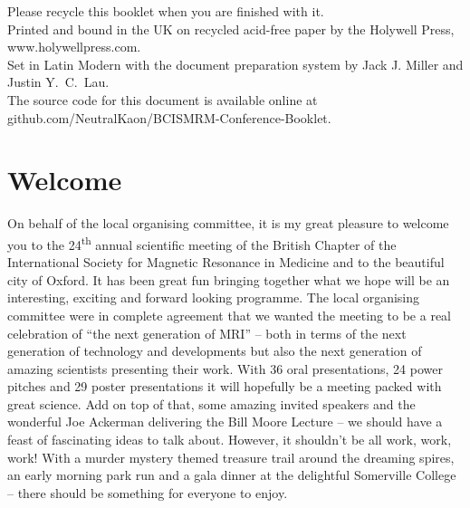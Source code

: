 \documentclass[a5paper,10pt,twoside,onecolumn,openany,helvetica,showtrims]{memoir}
\begin{document}
%
\frontmatter\thispagestyle{empty}\cleartoverso%
\checkandfixthelayout
\thispagestyle{empty} %
    \vspace*{\fill}
    \begin{minipage}{0.45\textwidth}
	\tiny Please recycle this booklet when you are finished with it.\\ Printed and bound in the UK on recycled acid-free paper by the Holywell Press, www.holywellpress.com. \\[2em]
	Set in Latin Modern with the \XeLaTeX{} document preparation system by Jack J. Miller and Justin Y.~C.~Lau.\\[2em]
	The source code for this document is available online at github.com/NeutralKaon/BCISMRM-Conference-Booklet. 
    \end{minipage}\cleartorecto
\tableofcontents*
{}
\mainmatter
\chapter{Welcome}
On behalf of the local organising committee, it is my great pleasure to welcome you to the 24\textsuperscript{th} annual scientific meeting of the British Chapter of the International Society for Magnetic Resonance in Medicine and to the beautiful city of Oxford.  It has been great fun bringing together what we hope will be an interesting, exciting and forward looking programme. The local organising committee were in complete agreement that we wanted the meeting to be a real celebration of ``the next generation of MRI'' – both in terms of the next generation of technology and developments but also the next generation of amazing scientists presenting their work. With 36 oral presentations, 24 power pitches and 29 poster presentations it will hopefully be a meeting packed with great science. Add on top of that, some amazing invited speakers and the wonderful Joe Ackerman delivering the Bill Moore Lecture -- we should have a feast of fascinating ideas to talk about. However, it shouldn't be all work, work, work! With a murder mystery themed treasure trail around the dreaming spires, an early morning park run and a gala dinner at the delightful Somerville College -- there should be something for everyone to enjoy.\\
\end{document}
